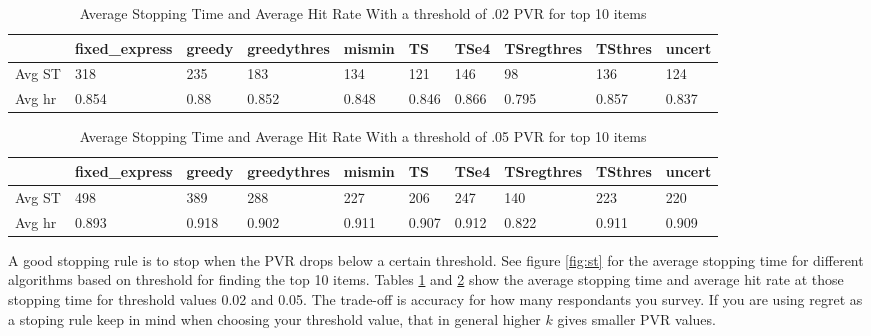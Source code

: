 \documentclass[nonblindrev]{informs3}
\begin{document}
\begin{table}
\begin{center}
\begin{tabular}{llllllllll}
\hline    &  fixed\_express &  greedy &  greedythres &  mismin &    TS &  TSe4 &  TSregthres &  TSthres &  uncert \\\hline  Avg ST  & 318 &   235 & 183 & 134 & 121 & 146 & 	98 &	136 &   124 \\  Avg hr  &  0.854 &  0.88 & 0.852&0.848 & 0.846 & 	0.866 & 0.795 &0.857 &  0.837 \end{tabular}
\end{center}
\caption{Average Stopping Time and Average Hit Rate With a threshold of .02 PVR for top 10 items}
\label{table:st2}
\end{table}
\begin{table}
\begin{center}
\begin{tabular}{llllllllll}
\hline    &  fixed\_express &  greedy &  greedythres &  mismin &    TS &  TSe4 &  TSregthres &  TSthres &  uncert \\\hline    Avg ST & 498 & 389 & 288 & 227 & 206 & 247 & 140 &223 &  220 \\ Avg hr & 0.893 &0.918&0.902& 	0.911 & 0.907& 0.912 & 0.822&0.911& 0.909\end{tabular}
\end{center}
\caption{Average Stopping Time and Average Hit Rate With a threshold of .05 PVR for top 10 items}
\label{table:st5}
\end{table}
 A good stopping rule is to stop when the PVR drops below a certain threshold. See figure \ref{fig:st} for the average stopping time for different algorithms based on threshold for finding the top 10 items. Tables \ref{table:st2} and \ref{table:st5} show the average stopping time and average hit rate at those stopping time for threshold values 0.02 and 0.05. The trade-off is accuracy for how many respondants you survey. If you are using regret as a stoping rule keep in mind when choosing your threshold value, that in general higher $k$ gives smaller PVR values. \\ 
\end{document}
